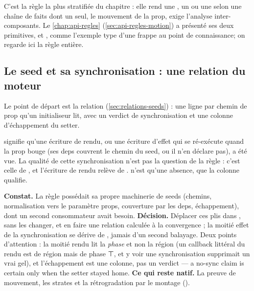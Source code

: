 C'est la règle la plus stratifiée du chapitre : elle rend une \Error, un \Warning{} ou une \Info{} selon une chaîne de faits dont un seul, le mouvement de la prop, exige l'analyse inter-composants. Le \cref{chap:api-regles} (\cref{sec:api-regles-motion}) a présenté ses deux primitives,  et , comme l'exemple type d'une frappe \og au point de connaissance\fg ; on regarde ici la règle entière.

\subsection{Le seed et sa synchronisation : une relation du moteur}

Le point de départ est la relation  (\cref{sec:relations-seeds}) : une ligne  par chemin de prop qu'un initialiseur  lit, avec un verdict de synchronisation et une colonne d'échappement du setter.



 signifie qu'une écriture de rendu, ou une écriture d'effet qui se ré-exécute quand la prop bouge (ses deps couvrent le chemin du seed, ou il n'en déclare pas), a été vue. La qualité de cette synchronisation n'est pas la question de la règle : c'est celle de , et l'écriture de rendu relève de .  n'est qu'une absence, que la colonne  qualifie.

\begin{decision}
\textbf{Constat.} La règle possédait sa propre machinerie de seeds (chemins, normalisation vers le paramètre props, couverture par les deps, échappement), dont un second consommateur avait besoin. \textbf{Décision.} Déplacer ces plis dans , sans les changer, et en faire une relation calculée à la convergence ; la moitié \og effet\fg{} de la synchronisation se dérive de , jamais d'un second balayage. Deux points d'attention : la moitié \og rendu\fg{} lit la \emph{phase} et non la région (un callback littéral du rendu est de région  mais de phase ⊤, et y voir une synchronisation supprimait un vrai gel), et l'échappement est une colonne, pas un verdict  --- \og a no-sync claim is certain only when the setter stayed home\fg. \textbf{Ce qui reste natif.} La preuve de mouvement, les strates \Info{} et la rétrogradation par le montage ().
\end{decision}

